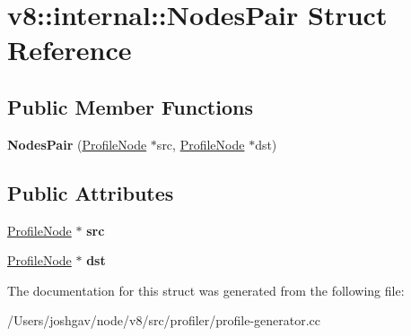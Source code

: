 \hypertarget{structv8_1_1internal_1_1_nodes_pair}{}\section{v8\+:\+:internal\+:\+:Nodes\+Pair Struct Reference}
\label{structv8_1_1internal_1_1_nodes_pair}
\subsection*{Public Member Functions}
\begin{DoxyCompactItemize}
\item 
{\bfseries Nodes\+Pair} (\hyperlink{classv8_1_1internal_1_1_profile_node}{Profile\+Node} $\ast$src, \hyperlink{classv8_1_1internal_1_1_profile_node}{Profile\+Node} $\ast$dst)\hypertarget{structv8_1_1internal_1_1_nodes_pair_acd47c7f1d3d29910685ce606408efed1}{}\label{structv8_1_1internal_1_1_nodes_pair_acd47c7f1d3d29910685ce606408efed1}

\end{DoxyCompactItemize}
\subsection*{Public Attributes}
\begin{DoxyCompactItemize}
\item 
\hyperlink{classv8_1_1internal_1_1_profile_node}{Profile\+Node} $\ast$ {\bfseries src}\hypertarget{structv8_1_1internal_1_1_nodes_pair_a147e83f2b5cbaa40ab7bc1db39e28d05}{}\label{structv8_1_1internal_1_1_nodes_pair_a147e83f2b5cbaa40ab7bc1db39e28d05}

\item 
\hyperlink{classv8_1_1internal_1_1_profile_node}{Profile\+Node} $\ast$ {\bfseries dst}\hypertarget{structv8_1_1internal_1_1_nodes_pair_a4fc530ce954145188fd801d556b71804}{}\label{structv8_1_1internal_1_1_nodes_pair_a4fc530ce954145188fd801d556b71804}

\end{DoxyCompactItemize}


The documentation for this struct was generated from the following file\+:\begin{DoxyCompactItemize}
\item 
/\+Users/joshgav/node/v8/src/profiler/profile-\/generator.\+cc\end{DoxyCompactItemize}
